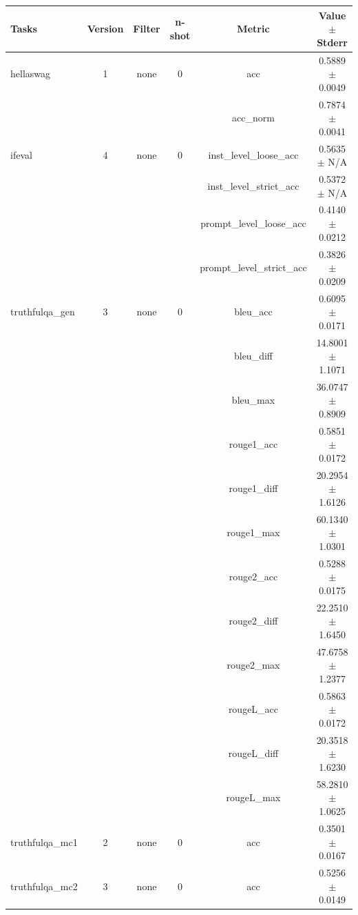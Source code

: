 \documentclass{ifacconf}
\begin{document}
\begin{strip}
\begin{minipage}{\textwidth}
    \begin{table}[H]
    \centering
    \begin{tabular}{|l|c|c|c|c|c|}
    \hline
    \textbf{Tasks} & \textbf{Version} & \textbf{Filter} & \textbf{n-shot} & \textbf{Metric} & \textbf{Value} $\pm$ \textbf{Stderr} \\ \hline
    hellaswag & 1 & none & 0 & acc & 0.5889 $\pm$ 0.0049 \\ \hline
    & & & & acc\_norm & 0.7874 $\pm$ 0.0041 \\ \hline
    ifeval & 4 & none & 0 & inst\_level\_loose\_acc & 0.5635 $\pm$ N/A \\ \hline
    & & & & inst\_level\_strict\_acc & 0.5372 $\pm$ N/A \\ \hline
    & & & & prompt\_level\_loose\_acc & 0.4140 $\pm$ 0.0212 \\ \hline
    & & & & prompt\_level\_strict\_acc & 0.3826 $\pm$ 0.0209 \\ \hline
    truthfulqa\_gen & 3 & none & 0 & bleu\_acc & 0.6095 $\pm$ 0.0171 \\ \hline
    & & & & bleu\_diff & 14.8001 $\pm$ 1.1071 \\ \hline
    & & & & bleu\_max & 36.0747 $\pm$ 0.8909 \\ \hline
    & & & & rouge1\_acc & 0.5851 $\pm$ 0.0172 \\ \hline
    & & & & rouge1\_diff & 20.2954 $\pm$ 1.6126 \\ \hline
    & & & & rouge1\_max & 60.1340 $\pm$ 1.0301 \\ \hline
    & & & & rouge2\_acc & 0.5288 $\pm$ 0.0175 \\ \hline
    & & & & rouge2\_diff & 22.2510 $\pm$ 1.6450 \\ \hline
    & & & & rouge2\_max & 47.6758 $\pm$ 1.2377 \\ \hline
    & & & & rougeL\_acc & 0.5863 $\pm$ 0.0172 \\ \hline
    & & & & rougeL\_diff & 20.3518 $\pm$ 1.6230 \\ \hline
    & & & & rougeL\_max & 58.2810 $\pm$ 1.0625 \\ \hline
    truthfulqa\_mc1 & 2 & none & 0 & acc & 0.3501 $\pm$ 0.0167 \\ \hline
    truthfulqa\_mc2 & 3 & none & 0 & acc & 0.5256 $\pm$ 0.0149 \\ \hline
    \end{tabular}
    \label{tab:llama31_q4km}
    \end{table}


\end{minipage}
\end{strip}
\end{document}
